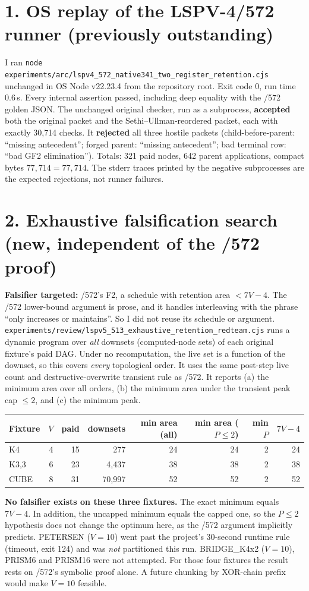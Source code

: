 \documentclass[11pt]{article}
\begin{document}
\section*{1. OS replay of the LSPV-4/572 runner (previously outstanding)}
I ran \texttt{node experiments/arc/lspv4\_572\_native341\_two\_register\_retention.cjs} unchanged in OS Node v22.23.4 from the repository root. Exit code 0, run time 0.6\,s. Every internal assertion passed, including deep equality with the /572 golden JSON. The unchanged original checker, run as a subprocess, \textbf{accepted} both the original packet and the Sethi--Ullman-reordered packet, each with exactly 30{,}714 checks. It \textbf{rejected} all three hostile packets (child-before-parent: ``missing antecedent''; forged parent: ``missing antecedent''; bad terminal row: ``bad GF2 elimination''). Totals: 321 paid nodes, 642 parent applications, compact bytes $77{,}714=77{,}714$. The stderr traces printed by the negative subprocesses are the expected rejections, not runner failures.

\section*{2. Exhaustive falsification search (new, independent of the /572 proof)}
\textbf{Falsifier targeted:} /572's F2, a schedule with retention area $<7V-4$. The /572 lower-bound argument is prose, and it handles interleaving with the phrase ``only increases or maintains''. So I did not reuse its schedule or argument. \texttt{experiments/review/lspv5\_513\_exhaustive\_retention\_redteam.cjs} runs a dynamic program over \emph{all} downsets (computed-node sets) of each original fixture's paid DAG. Under no recomputation, the live set is a function of the downset, so this covers \emph{every} topological order. It uses the same post-step live count and destructive-overwrite transient rule as /572. It reports (a) the minimum area over all orders, (b) the minimum area under the transient peak cap $\le2$, and (c) the minimum peak.

\begin{center}
\begin{tabular}{lrrrrrrr}
\toprule
Fixture & $V$ & paid & downsets & min area (all) & min area ($P\le2$) & min $P$ & $7V-4$\\
\midrule
K4 & 4 & 15 & 277 & 24 & 24 & 2 & 24\\
K3,3 & 6 & 23 & 4{,}437 & 38 & 38 & 2 & 38\\
CUBE & 8 & 31 & 70{,}997 & 52 & 52 & 2 & 52\\
\bottomrule
\end{tabular}
\end{center}
\noindent \textbf{No falsifier exists on these three fixtures.} The exact minimum equals $7V-4$. In addition, the uncapped minimum equals the capped one, so the $P\le2$ hypothesis does not change the optimum here, as the /572 argument implicitly predicts. PETERSEN ($V=10$) went past the project's 30-second runtime rule (timeout, exit 124) and was \emph{not} partitioned this run. BRIDGE\_K4x2 ($V=10$), PRISM6 and PRISM16 were not attempted. For those four fixtures the result rests on /572's symbolic proof alone. A future chunking by XOR-chain prefix would make $V=10$ feasible.
\end{document}
